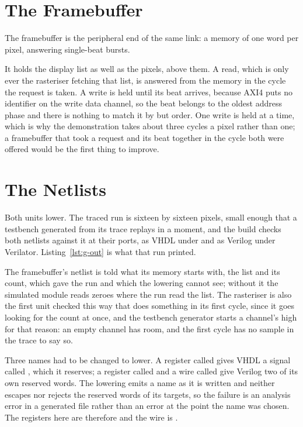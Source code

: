 \documentclass[journal,9pt]{IEEEtran}
\newcommand{\gpupart}[4]{%
}
\begin{document}
\section{The Framebuffer}
\label{sec:g-fb}

The framebuffer is the peripheral end of the same link: a memory of
one word per pixel, answering single-beat bursts.

\gpupart{fb.rs}{run}{The framebuffer.}{lst:g-fb}

It holds the display list as well as the pixels, above them. A read,
which is only ever the rasteriser fetching that list, is answered
from the memory in the cycle the request is taken.
A write is held until its beat arrives, because AXI4 puts no
identifier on the write data channel, so the beat belongs to the
oldest address phase and there is nothing to match it by but order.
One write is held at a time, which is why the demonstration takes
about three cycles a pixel rather than one; a framebuffer that took a
request and its beat together in the cycle both were offered would be
the first thing to improve.

\section{The Netlists}
\label{sec:g-netlist}

Both units lower. The traced run is sixteen by sixteen pixels, small
enough that a testbench generated from its trace replays in a moment,
and the build checks both netlists against it at their ports, as VHDL
under  and as Verilog under Verilator. Listing~\ref{lst:g-out}
is what that run printed.

The framebuffer's netlist is told what its memory starts with, the
list and its count, which  gave the run and which the
lowering cannot see; without it the simulated module reads zeroes
where the run read the list. The rasteriser is also the first unit
checked this way that does something in its first cycle, since it
goes looking for the count at once, and the testbench generator
starts a channel's  high for that reason: an empty
channel has room, and the first cycle has no sample in the trace to
say so.



Three names had to be changed to lower. A register called 
gives VHDL a signal called , which it reserves; a register
called  and a wire called  give Verilog two of
its own reserved words. The lowering emits a name as it is written
and neither escapes nor rejects the reserved words of its targets, so
the failure is an analysis error in a generated file rather than an
error at the point the name was chosen. The registers here are
therefore  and the wire is .
\end{document}
